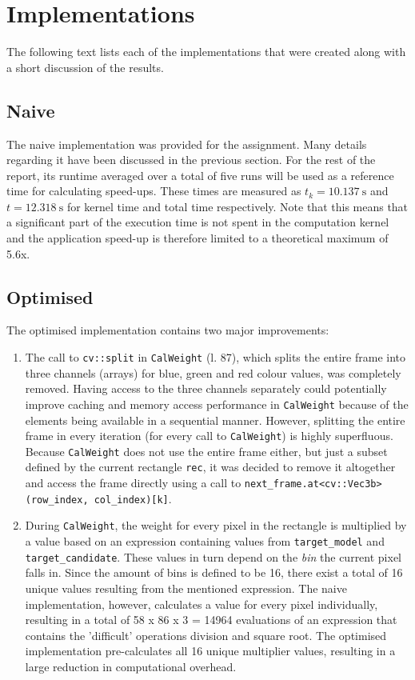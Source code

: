 \documentclass[final]{article}
\begin{document}
\section{Implementations}
\label{sec:implementations}

The following text lists each of the implementations that were created along with a short discussion of the results.

\subsection{Naive}
The naive implementation was provided for the assignment.
Many details regarding it have been discussed in the previous section.
For the rest of the report, its runtime averaged over a total of five runs will be used as a reference time for calculating speed-ups.
These times are measured as $t_k = \SI{10.137}{\second}$ and $t = \SI{12.318}{\second}$ for kernel time and total time respectively.
Note that this means that a significant part of the execution time is not spent in the computation kernel and the application speed-up is therefore limited to a theoretical maximum of 5.6x.

\subsection{Optimised}
The optimised implementation contains two major improvements:

\begin{enumerate}
    \item The call to \texttt{cv::split} in \texttt{CalWeight} (l. 87), which splits the entire frame into three channels (arrays) for blue, green and red colour values, was completely removed. Having access to the three channels separately could potentially improve caching and memory access performance in \texttt{CalWeight} because of the elements being available in a sequential manner. However, splitting the entire frame in every iteration (for every call to \texttt{CalWeight}) is highly superfluous. Because \texttt{CalWeight} does not use the entire frame either, but just a subset defined by the current rectangle \texttt{rec}, it was decided to remove it altogether and access the frame directly using a call to \texttt{next\_frame.at<cv::Vec3b>(row\_index, col\_index)[k]}.

    \item During \texttt{CalWeight}, the weight for every pixel in the rectangle is multiplied by a value based on an expression containing values from \texttt{target\_model} and \texttt{target\_candidate}. These values in turn depend on the \emph{bin} the current pixel falls in. Since the amount of bins is defined to be 16, there exist a total of 16 unique values resulting from the mentioned expression. The naive implementation, however, calculates a value for every pixel individually, resulting in a total of 58 x 86 x 3 = 14964 evaluations of an expression that contains the 'difficult' operations division and square root. The optimised implementation pre-calculates all 16 unique multiplier values, resulting in a large reduction in computational overhead.
\end{enumerate}
\end{document}
